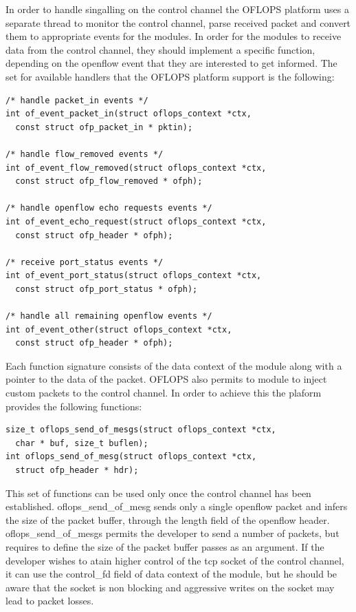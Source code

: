 \documentclass{book}
\begin{document}
In order to handle singalling on the control channel the OFLOPS platform uses a separate thread to monitor the control channel,
parse received packet and convert them to appropriate events for the modules. In order for the modules to receive data from the 
control channel, they should implement a specific function, depending on the openflow event that they are interested to get informed.
The set for available handlers that the OFLOPS platform support is the following:
\begin{lstlisting}
/* handle packet_in events */
int of_event_packet_in(struct oflops_context *ctx, 
  const struct ofp_packet_in * pktin);

/* handle flow_removed events */
int of_event_flow_removed(struct oflops_context *ctx, 
  const struct ofp_flow_removed * ofph);

/* handle openflow echo requests events */
int of_event_echo_request(struct oflops_context *ctx, 
  const struct ofp_header * ofph);

/* receive port_status events */
int of_event_port_status(struct oflops_context *ctx, 
  const struct ofp_port_status * ofph);

/* handle all remaining openflow events */
int of_event_other(struct oflops_context *ctx, 
  const struct ofp_header * ofph);
\end{lstlisting}

Each function signature consists of the data context of the module along with a pointer to the data of the packet. OFLOPS also permits
to module to inject custom packets to the control channel. In order to achieve this the plaform provides the following functions:

\begin{lstlisting}
size_t oflops_send_of_mesgs(struct oflops_context *ctx, 
  char * buf, size_t buflen);
int oflops_send_of_mesg(struct oflops_context *ctx, 
  struct ofp_header * hdr);
\end{lstlisting}

This set of functions can be used only once the control channel has been established. oflops\_send\_of\_mesg sends only a single 
openflow packet and infers the size of the packet buffer, through the length field of the openflow header. oflops\_send\_of\_mesgs
permits the developer to send a number of packets, but requires to define the size of the packet buffer passes as an argument. 
If the developer wishes to atain higher control of the tcp socket of the control channel, it can use the control\_fd field of 
data context of the module, but he should be aware that the socket is non blocking and aggressive writes on the socket may lead 
to packet losses. 
\end{document}

